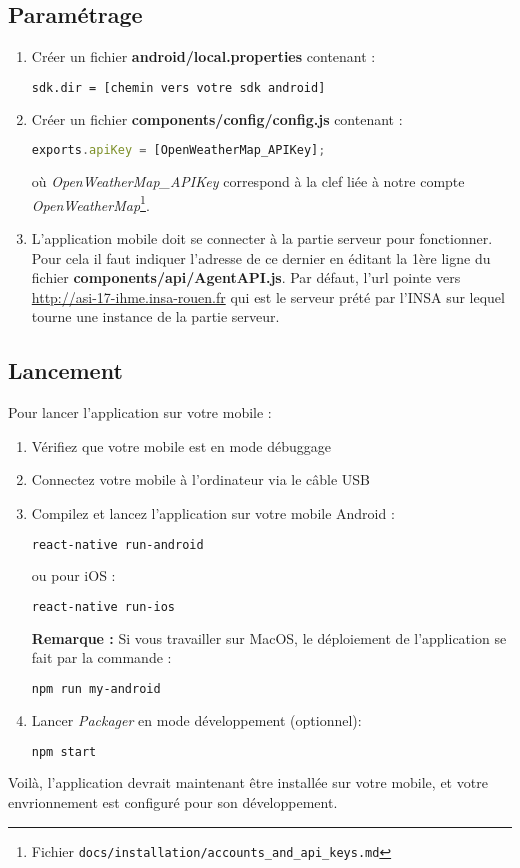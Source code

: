 \subsection{Paramétrage}

\begin{enumerate}
  \item Créer un fichier \textbf{android/local.properties} contenant :
  \begin{lstlisting}[language=bash]
  sdk.dir = [chemin vers votre sdk android]
  \end{lstlisting}
  \item Créer un fichier \textbf{components/config/config.js} contenant :
  \begin{lstlisting}[language=Javascript]
  exports.apiKey = [OpenWeatherMap_APIKey];
  \end{lstlisting}

  où \og \emph{OpenWeatherMap\_APIKey} \fg{} correspond à la clef liée à notre compte \emph{OpenWeatherMap}\footnote{Fichier \texttt{docs/installation/accounts\_and\_api\_keys.md}}.

  \item L'application mobile doit se connecter à la partie serveur pour fonctionner. Pour cela il faut indiquer l'adresse de ce dernier en
  éditant la 1ère ligne du fichier \textbf{components/api/AgentAPI.js}. Par défaut, l'url pointe vers \url{http://asi-17-ihme.insa-rouen.fr} qui est le serveur prété par l'INSA sur lequel tourne une instance de la partie serveur.
\end{enumerate}

\subsection{Lancement}

Pour lancer l'application sur votre mobile :
\begin{enumerate}
  \item Vérifiez que votre mobile est en mode débuggage
  \item Connectez votre mobile à l'ordinateur via le câble USB
  \item Compilez et lancez l'application sur votre mobile Android :
  \begin{lstlisting}[language=bash]
    react-native run-android
  \end{lstlisting}
  ou pour iOS :
  \begin{lstlisting}[language=bash]
    react-native run-ios
  \end{lstlisting}

  \textbf{Remarque : } Si vous travailler sur MacOS, le déploiement de l'application se fait par la commande :
  \begin{lstlisting}[language=bash]
    npm run my-android
  \end{lstlisting}

  \item Lancer \emph{Packager} en mode développement (optionnel):
  \begin{lstlisting}[language=bash]
    npm start
  \end{lstlisting}
\end{enumerate}

Voilà, l'application devrait maintenant être installée sur votre mobile, et votre envrionnement est configuré pour son développement.
